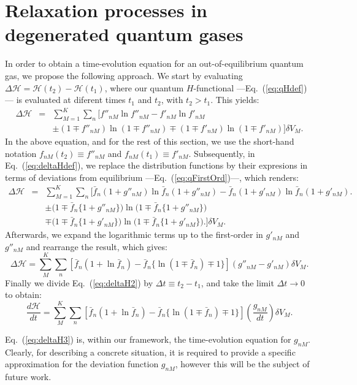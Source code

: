 
\section{Relaxation processes in degenerated quantum gases}\label{sec:relaxproc}

In order to obtain a time-evolution equation for an out-of-equilibrium quantum gas,
we propose the following approach. We start by evaluating $\Delta\mathcal{H}=
\mathcal{H}(t_2)-\mathcal{H}(t_1)$,
where our quantum $H$-functional ---Eq.~(\ref{eq:qHdef})--- is evaluated at diferent times $t_1$ and $t_2$, with
$t_2 > t_1$. This yields:
%
\begin{eqnarray}\label{eq:deltaHdef}
	\Delta\mathcal H &=& \sum_{M=1}^{K}\sum_n [f''_{nM} \ln f''_{nM} - f'_{nM}	\ln f'_{nM}\nonumber \\ 
			&&\pm (1\mp f''_{nM}) \ln(1\mp f''_{nM}) \mp (1\mp f'_{nM}) \ln (1\mp f'_{nM})]\delta V_M. 
\end{eqnarray}
%
In the above equation, and for the rest of this section, we use the short-hand notation
$f_{nM}(t_2)\equiv f''_{nM}$ and 
$f_{nM}(t_1) \equiv f'_{nM}$.
Subsequently, in Eq.~(\ref{eq:deltaHdef}), we replace the distribution functions by their expresions in terms
of deviations from equilibrium ---Eq.~(\ref{eq:qFirstOrd})---, which renders:
\begin{eqnarray}\label{eq:deltaH1}
	\Delta\mathcal H &=& \sum_{M=1}^{K} \sum_n\Big[\bar{f}_n(1+g''_{nM}) \ln \bar{f}_{n}(1+g''_{nM})  -  
			\bar{f}_n(1+g'_{nM}) \ln \bar{f}_n(1+g'_{nM})\Big. \nonumber \\
		    &&  \pm \big(1 \mp \bar{f}_n \{1+g''_{nM}\}\big) \ln \big(1\mp \bar{f}_n\{1+g''_{nM} \}\big)\nonumber \\
		    &&  \mp \big(1\mp \bar{f}_n \{ 1+g'_{nM} \}\big) \ln\big(1\mp \bar{f}_n \{1+g'_{nM} \}\big)\Big.\Big]
		    \delta V_M.
\end{eqnarray}
Afterwards, we expand the logarithmic terms up to the first-order in $g'_{nM}$ and $g''_{nM}$
and rearrange the result, which gives:
%
\begin{equation}\label{eq:deltaH2}
\Delta\mathcal H = \sum_{M}^{K}\sum_n [\bar{f}_n(1
	+\ln \bar{f}_n)-\bar{f}_n \{\ln(1\mp \bar{f}_n)\mp 1 \}](g''_{nM}-g'_{nM})\delta V_M.
\end{equation}
%
Finally we divide Eq.~(\ref{eq:deltaH2}) by $\Delta t\equiv t_2-t_1$, and take the limit
$\Delta t\to0$ to obtain:
%
\begin{equation}\label{eq:deltaH3}
\frac{d\mathcal H}{dt} = \sum_{M}^{K}\sum_n [\bar{f}_n(1
	+\ln \bar{f}_n)-\bar{f}_n \{\ln(1\mp \bar{f}_n)\mp 1 \}]\left(\frac{g_{nM}}{dt}\right)\delta V_M.
\end{equation}
%

Eq.~(\ref{eq:deltaH3}) is, within our framework, the time-evolution equation for $g_{nM}$.
Clearly, for describing a concrete situation, it is required to provide a specific approximation for the deviation function $g_{nM}$, however this will be the subject of future work.

  



